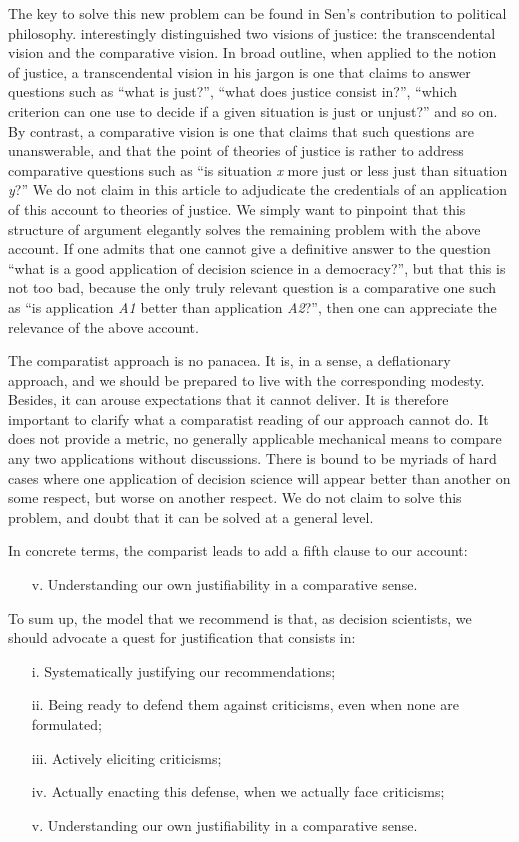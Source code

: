 \documentclass[preprint, french, english, 11pt, authoryear]{elsarticle}%
\begin{document}
The key to solve this new problem can be found in Sen's contribution to political philosophy. \cite{sen_idea_2009} interestingly distinguished two visions of justice: the transcendental vision and the comparative vision. In broad outline, when applied to the notion of justice, a transcendental vision in his jargon is one that claims to answer questions such as ``what is just?'', ``what does justice consist in?'', ``which criterion can one use to decide if a given situation is just or unjust?'' and so on. By contrast, a comparative vision is one that claims that such questions are unanswerable, and that the point of theories of justice is rather to address comparative questions such as ``is situation \emph{x} more just or less just than situation \emph{y}?'' We do not claim in this article to adjudicate the credentials of an application of this account to theories of justice. We simply want to pinpoint that this structure of argument elegantly solves the remaining problem with the above account. If one admits that one cannot give a definitive answer to the question ``what is a good application of decision science in a democracy?'', but that this is not too bad, because the only truly relevant question is a comparative one such as ``is application \emph{A1} better than application \emph{A2}?'', then one can appreciate the relevance of the above account.

The comparatist approach is no panacea. It is, in a sense, a deflationary approach, and we should be prepared to live with the corresponding modesty. 
Besides, it can arouse expectations that it cannot deliver. It is therefore important to clarify what a comparatist reading of our approach cannot do. It does not provide a metric, no generally applicable mechanical means to compare any two applications without discussions. There is bound to be myriads of hard cases where one application of decision science will appear better than another on some respect, but worse on another respect. We do not claim to solve this problem, and doubt that it can be solved at a general level.

In concrete terms, the comparist leads to add a fifth clause to our account:
\begin{itemize}
\item[v.]	Understanding our own justifiability in a comparative sense.
\end{itemize}

To sum up, the model that we recommend is that, as decision scientists, we should advocate a quest for justification that consists in:
\begin{itemize}
\item[i.]	Systematically justifying our recommendations;
\item[ii.]	Being ready to defend them against criticisms, even when none are formulated;
\item[iii.]	Actively eliciting criticisms;
\item[iv.]	Actually enacting this defense, when we actually face criticisms;
\item[v.]	Understanding our own justifiability in a comparative sense.
\end{itemize}
\end{document}
